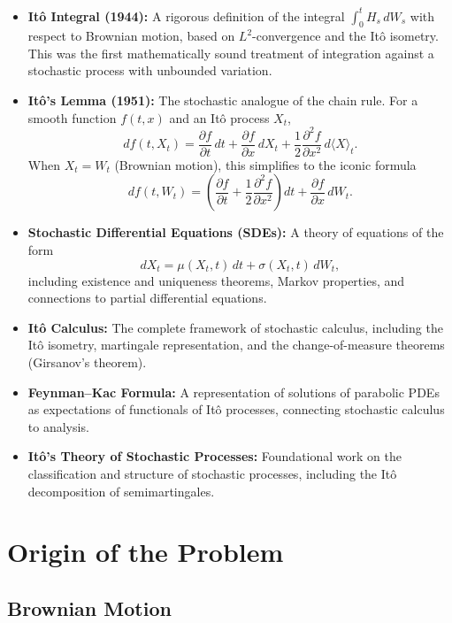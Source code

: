 \begin{itemize}
    \item \textbf{It\^{o} Integral (1944):} A rigorous definition of the integral \(\int_0^t H_s \, dW_s\) with respect to Brownian motion, based on \(L^2\)-convergence and the It\^{o} isometry. This was the first mathematically sound treatment of integration against a stochastic process with unbounded variation.
    \item \textbf{It\^{o}'s Lemma (1951):} The stochastic analogue of the chain rule. For a smooth function \(f(t,x)\) and an It\^{o} process \(X_t\),
    \[
    df(t,X_t) = \frac{\partial f}{\partial t}\,dt + \frac{\partial f}{\partial x}\,dX_t + \frac12 \frac{\partial^2 f}{\partial x^2}\,d\langle X\rangle_t.
    \]
    When \(X_t = W_t\) (Brownian motion), this simplifies to the iconic formula
    \[
    df(t,W_t) = \left(\frac{\partial f}{\partial t} + \frac12 \frac{\partial^2 f}{\partial x^2}\right) dt + \frac{\partial f}{\partial x}\,dW_t.
    \]
    \item \textbf{Stochastic Differential Equations (SDEs):} A theory of equations of the form
    \[
    dX_t = \mu(X_t, t)\,dt + \sigma(X_t, t)\,dW_t,
    \]
    including existence and uniqueness theorems, Markov properties, and connections to partial differential equations.
    \item \textbf{It\^{o} Calculus:} The complete framework of stochastic calculus, including the It\^{o} isometry, martingale representation, and the change-of-measure theorems (Girsanov's theorem).
    \item \textbf{Feynman--Kac Formula:} A representation of solutions of parabolic PDEs as expectations of functionals of It\^{o} processes, connecting stochastic calculus to analysis.
    \item \textbf{It\^{o}'s Theory of Stochastic Processes:} Foundational work on the classification and structure of stochastic processes, including the It\^{o} decomposition of semimartingales.
\end{itemize}

\section{Origin of the Problem}

\subsection{Brownian Motion}

